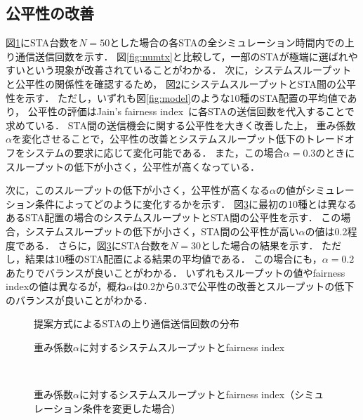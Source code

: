 \documentclass[technicalreport]{ieicej}
\begin{document}
	\subsection{公平性の改善}
	図\ref{fig:fair}にSTA台数を$N=50$とした場合の各STAの全シミュレーション時間内での上り通信送信回数を示す．
	図\ref{fig:numtx}と比較して，一部のSTAが極端に選ばれやすいという現象が改善されていることがわかる．
	次に，システムスループットと公平性の関係性を確認するため，
	図\ref{fig:thr_fair}にシステムスループットとSTA間の公平性を示す．
	ただし，いずれも図\ref{fig:model}のような10種のSTA配置の平均値であり，
	公平性の評価はJain's fairness index~\cite{jain}に各STAの送信回数を代入することで求めている．
	STA間の送信機会に関する公平性を大きく改善した上，
	重み係数$\alpha$を変化させることで，公平性の改善とシステムスループット低下のトレードオフをシステムの要求に応じて変化可能である．
	また，この場合$\alpha=0.3$のときにスループットの低下が小さく，公平性が高くなっている．
	\par
	次に，このスループットの低下が小さく，公平性が高くなる$\alpha$の値がシミュレーション条件によってどのように変化するかを示す．
	図\ref{fig:chgparam}に最初の10種とは異なるあるSTA配置の場合のシステムスループットとSTA間の公平性を示す．
	この場合，システムスループットの低下が小さく，STA間の公平性が高い$\alpha$の値は0.2程度である．
	さらに，図\ref{fig:chgparam}にSTA台数を$N=30$とした場合の結果を示す．
	ただし，結果は10種のSTA配置による結果の平均値である．
	この場合にも，$\alpha=0.2$あたりでバランスが良いことがわかる．
	いずれもスループットの値やfairness indexの値は異なるが，概ね$\alpha$は0.2から0.3で公平性の改善とスループットの低下のバランスが良いことがわかる．

	\begin{figure}[t]
		\centering
		\caption{提案方式によるSTAの上り通信送信回数の分布}
		\label{fig:fair}
	\end{figure}

	\begin{figure}[t]
		\centering
		\caption{重み係数$\alpha$に対するシステムスループットとfairness index}
		\label{fig:thr_fair}
	\end{figure}

	\begin{figure}[t]
		\centering
		\\
		\caption{重み係数$\alpha$に対するシステムスループットとfairness index（シミュレーション条件を変更した場合）}
		\label{fig:chgparam}
	\end{figure}
\end{document}

